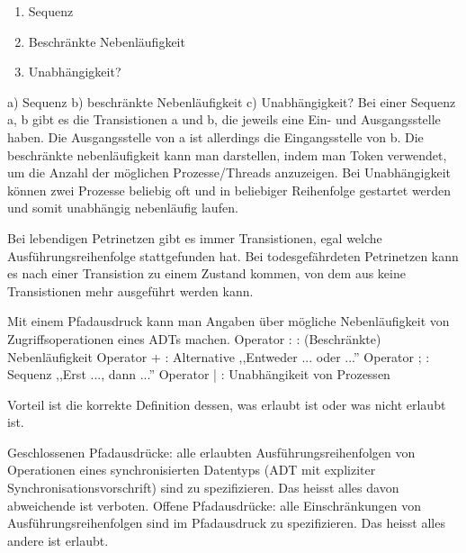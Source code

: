 \begin{multilinequestion}
\begin{enumerate}
\item Sequenz
\item Beschränkte Nebenläufigkeit
\item Unabhängigkeit?
\end{enumerate}
\end{multilinequestion}
\begin{answer}
a) Sequenz
b) beschränkte Nebenläufigkeit
c) Unabhängigkeit?
Bei einer Sequenz a, b gibt es die Transistionen a und b, die jeweils eine Ein- und Ausgangsstelle
haben. Die Ausgangsstelle von a ist allerdings die Eingangsstelle von b.
Die beschränkte nebenläufigkeit kann man darstellen, indem man Token verwendet, um die Anzahl
der möglichen Prozesse/Threads anzuzeigen.
Bei Unabhängigkeit können zwei Prozesse beliebig oft und in beliebiger Reihenfolge gestartet
werden und somit unabhängig nebenläufig laufen.
\end{answer}

\begin{answer}
Bei lebendigen Petrinetzen gibt es immer Transistionen, egal welche Ausführungsreihenfolge stattgefunden
hat.
Bei todesgefährdeten Petrinetzen kann es nach einer Transistion zu einem Zustand kommen, von
dem aus keine Transistionen mehr ausgeführt werden kann.
\end{answer}

\begin{answer}
Mit einem Pfadausdruck kann man Angaben über mögliche Nebenläufigkeit von Zugriffsoperationen
eines ADTs machen.
Operator : : (Beschränkte) Nebenläufigkeit
Operator + : Alternative ,,Entweder ... oder ...''
Operator ; : Sequenz ,,Erst ..., dann ...''
Operator | : Unabhängikeit von Prozessen
\end{answer}

\begin{answer}
Vorteil ist die korrekte Definition dessen, was erlaubt ist oder was nicht erlaubt ist.
\end{answer}

\begin{answer}
Geschlossenen Pfadausdrücke: alle erlaubten Ausführungsreihenfolgen von Operationen eines synchronisierten
Datentyps (ADT mit expliziter Synchronisationsvorschrift) sind zu spezifizieren. Das
heisst alles davon abweichende ist verboten.
Offene Pfadausdrücke: alle Einschränkungen von Ausführungsreihenfolgen sind im Pfadausdruck
zu spezifizieren. Das heisst alles andere ist erlaubt.
\end{answer}


